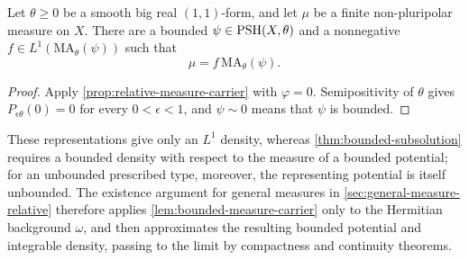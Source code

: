 \begin{lemma}\label{lem:bounded-measure-carrier}
Let $\theta\geq0$ be a smooth big real $(1,1)$-form, and let $\mu$ be a finite non-pluripolar measure on $X$. There are a bounded $\psi\in\mathrm{PSH}(X,\theta)$ and a nonnegative
$f\in L^1(\mathrm{MA}_\theta(\psi))$ such that
\[
 \mu=f\,\mathrm{MA}_\theta(\psi).
\]

\end{lemma}
\begin{proof}
Apply \cref{prop:relative-measure-carrier} with $\varphi=0$. Semipositivity of $\theta$ gives $P_{\epsilon\theta}(0)=0$ for every $0<\epsilon<1$, and $\psi\sim0$ means that $\psi$ is bounded.
\end{proof}

These representations give only an $L^1$ density, whereas \cref{thm:bounded-subsolution} requires a bounded density with respect to the measure of a bounded potential; for an unbounded prescribed type, moreover, the representing potential is itself unbounded. The existence argument for general measures in \cref{sec:general-measure-relative} therefore applies \cref{lem:bounded-measure-carrier} only to the Hermitian background $\omega$, and then approximates the resulting bounded potential and integrable density, passing to the limit by compactness and continuity theorems.
